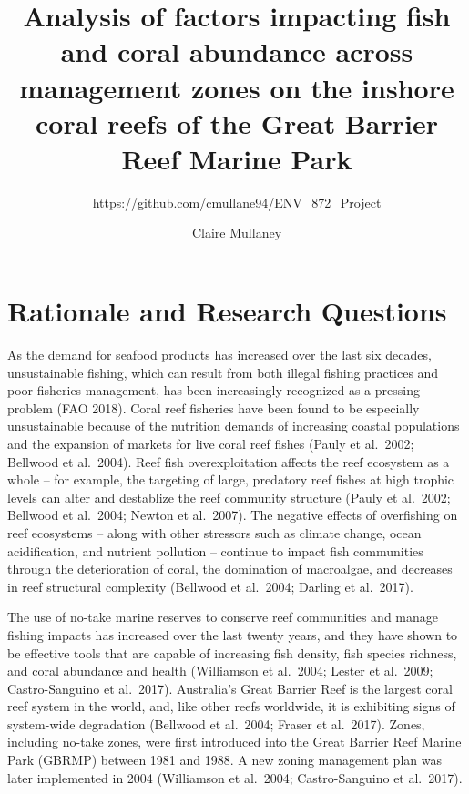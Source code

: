 \documentclass[12pt,]{article}
\title{Analysis of factors impacting fish and coral abundance across management
zones on the inshore coral reefs of the Great Barrier Reef Marine Park}
\subtitle{\url{https://github.com/cmullane94/ENV_872_Project}}
\author{Claire Mullaney}
\date{}
\begin{document}
\maketitle

\newpage
\tableofcontents 
\newpage
\listoffigures 
\newpage

\hypertarget{rationale-and-research-questions}{%
\section{Rationale and Research
Questions}\label{rationale-and-research-questions}}

As the demand for seafood products has increased over the last six
decades, unsustainable fishing, which can result from both illegal
fishing practices and poor fisheries management, has been increasingly
recognized as a pressing problem (FAO 2018). Coral reef fisheries have
been found to be especially unsustainable because of the nutrition
demands of increasing coastal populations and the expansion of markets
for live coral reef fishes (Pauly et al.~2002; Bellwood et al.~2004).
Reef fish overexploitation affects the reef ecosystem as a whole -- for
example, the targeting of large, predatory reef fishes at high trophic
levels can alter and destablize the reef community structure (Pauly et
al.~2002; Bellwood et al.~2004; Newton et al.~2007). The negative
effects of overfishing on reef ecosystems -- along with other stressors
such as climate change, ocean acidification, and nutrient pollution --
continue to impact fish communities through the deterioration of coral,
the domination of macroalgae, and decreases in reef structural
complexity (Bellwood et al.~2004; Darling et al.~2017).

The use of no-take marine reserves to conserve reef communities and
manage fishing impacts has increased over the last twenty years, and
they have shown to be effective tools that are capable of increasing
fish density, fish species richness, and coral abundance and health
(Williamson et al.~2004; Lester et al.~2009; Castro-Sanguino et
al.~2017). Australia's Great Barrier Reef is the largest coral reef
system in the world, and, like other reefs worldwide, it is exhibiting
signs of system-wide degradation (Bellwood et al.~2004; Fraser et
al.~2017). Zones, including no-take zones, were first introduced into
the Great Barrier Reef Marine Park (GBRMP) between 1981 and 1988. A new
zoning management plan was later implemented in 2004 (Williamson et
al.~2004; Castro-Sanguino et al.~2017).
\end{document}
